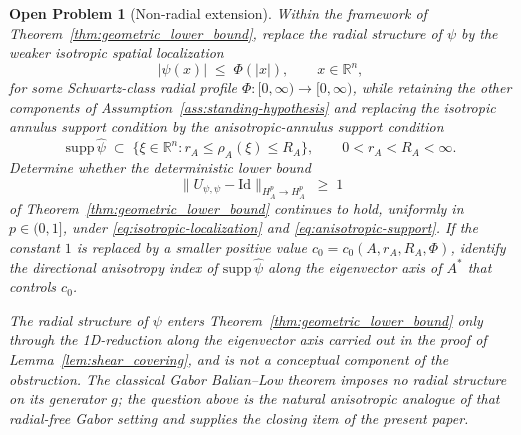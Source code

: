 \documentclass[pdflatex,sn-basic,Numbered]{sn-jnl}
\theoremstyle{thmstyleone}%
\theoremstyle{thmstylethree}%
\newtheorem{openproblem}[theorem]{Open Problem}
\begin{document}
\begin{openproblem}[Non-radial extension]\label{prob:non-radial}
	Within the framework of Theorem~\ref{thm:geometric_lower_bound},
	replace the radial structure of $\psi$ by the weaker isotropic
	spatial localization
	\begin{equation}\label{eq:isotropic-localization}
		|\psi(x)| \;\le\; \Phi(|x|),
		\qquad x \in \mathbb{R}^n ,
	\end{equation}
	for some Schwartz-class radial profile
	$\Phi \colon [0, \infty) \to [0, \infty)$, while retaining the
	other components of Assumption~\ref{ass:standing-hypothesis} and
	replacing the isotropic annulus support condition by the
	anisotropic-annulus support condition
	\begin{equation}\label{eq:anisotropic-support}
		\mathrm{supp}\, \widehat{\psi}
		\;\subset\; \bigl\{ \xi \in \mathbb{R}^n :
		r_A \le \rho_A(\xi) \le R_A \bigr\},
		\qquad 0 < r_A < R_A < \infty .
	\end{equation}
	Determine whether the deterministic lower bound
	\begin{equation}\label{eq:non-radial-question}
		\bigl\| U_{\psi, \psi} - \mathrm{Id} \bigr\|_{H^p_A \to H^p_A}
		\;\ge\; 1
	\end{equation}
	of Theorem~\ref{thm:geometric_lower_bound} continues to hold,
	uniformly in $p \in (0, 1]$, under
	\eqref{eq:isotropic-localization} and
	\eqref{eq:anisotropic-support}. If the constant $1$ is replaced
	by a smaller positive value $c_0 = c_0(A, r_A, R_A, \Phi)$,
	identify the directional anisotropy index of
	$\mathrm{supp}\, \widehat{\psi}$ along the eigenvector axis of $A^{*}$
	that controls $c_0$.
	
	The radial structure of $\psi$ enters
	Theorem~\ref{thm:geometric_lower_bound} only through the
	1D-reduction along the eigenvector axis carried out in the proof
	of Lemma~\ref{lem:shear_covering}, and is not a conceptual
	component of the obstruction. The classical Gabor Balian--Low
	theorem \cite{Karlheinz2001, Fu2011} imposes no radial structure
	on its generator $g$; the question above is the natural
	anisotropic analogue of that radial-free Gabor setting and
	supplies the closing item of the present paper.
\end{openproblem}

\backmatter

\end{document}
